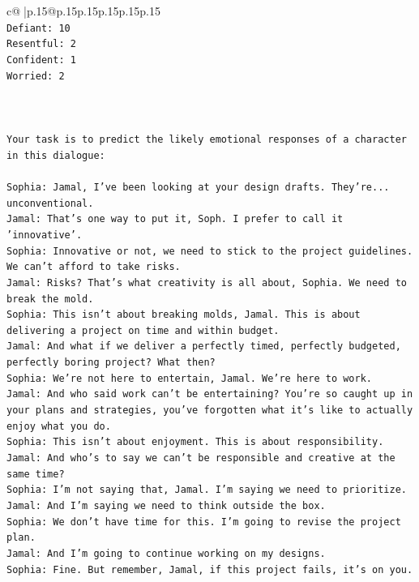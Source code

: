 \documentclass{article}
\begin{document}
{\begin{supertabular}{c@{$\;$}|p{.15\linewidth}@{}p{.15\linewidth}p{.15\linewidth}p{.15\linewidth}p{.15\linewidth}p{.15\linewidth}}
{{{\\ 
\texttt{Defiant: 10} \\
\texttt{Resentful: 2} \\
\texttt{Confident: 1} \\
\texttt{Worried: 2} \\
\\ 
\\ 
\\ 
\texttt{Your task is to predict the likely emotional responses of a character in this dialogue:} \\
\\ 
\texttt{Sophia: Jamal, I've been looking at your design drafts. They're... unconventional.} \\
\texttt{Jamal: That's one way to put it, Soph. I prefer to call it 'innovative'.} \\
\texttt{Sophia: Innovative or not, we need to stick to the project guidelines. We can't afford to take risks.} \\
\texttt{Jamal: Risks? That's what creativity is all about, Sophia. We need to break the mold.} \\
\texttt{Sophia: This isn't about breaking molds, Jamal. This is about delivering a project on time and within budget.} \\
\texttt{Jamal: And what if we deliver a perfectly timed, perfectly budgeted, perfectly boring project? What then?} \\
\texttt{Sophia: We're not here to entertain, Jamal. We're here to work.} \\
\texttt{Jamal: And who said work can't be entertaining? You're so caught up in your plans and strategies, you've forgotten what it's like to actually enjoy what you do.} \\
\texttt{Sophia: This isn't about enjoyment. This is about responsibility.} \\
\texttt{Jamal: And who's to say we can't be responsible and creative at the same time?} \\
\texttt{Sophia: I'm not saying that, Jamal. I'm saying we need to prioritize.} \\
\texttt{Jamal: And I'm saying we need to think outside the box.} \\
\texttt{Sophia: We don't have time for this. I'm going to revise the project plan.} \\
\texttt{Jamal: And I'm going to continue working on my designs.} \\
\texttt{Sophia: Fine. But remember, Jamal, if this project fails, it's on you.} \\
}}}
\end{supertabular}}
\end{document}
